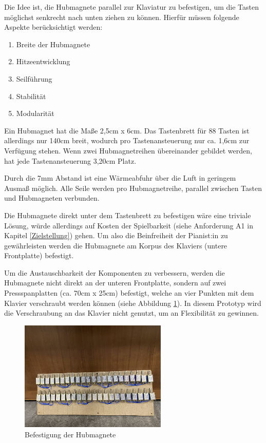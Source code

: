 Die Idee ist, die Hubmagnete parallel zur Klaviatur zu befestigen, um die Tasten möglichst senkrecht nach unten ziehen zu können.
Hierfür müssen folgende Aspekte berücksichtigt werden:

\begin{enumerate}
    \item Breite der Hubmagnete
    \item Hitzeentwicklung
    \item Seilführung
    \item Stabilität
    \item Modularität
\end{enumerate}

Ein Hubmagnet hat die Maße 2,5cm x 6cm.
Das Tastenbrett für 88 Tasten ist allerdings nur 140cm breit, wodurch pro Tastenansteuerung nur ca. 1,6cm zur Verfügung stehen.
Wenn zwei Hubmagnetreihen übereinander gebildet werden, hat jede Tastenansteuerung 3,20cm Platz.

Durch die 7mm Abstand ist eine Wärmeabfuhr über die Luft in geringem Ausmaß möglich.
Alle Seile werden pro Hubmagnetreihe, parallel zwischen Tasten und Hubmagneten verbunden.

Die Hubmagnete direkt unter dem Tastenbrett zu befestigen wäre eine triviale Lösung, würde allerdings auf Kosten der Spielbarkeit (siehe Anforderung A1 in Kapitel \ref{Zielstellung}) gehen.
Um also die Beinfreiheit der Pianist:in zu gewährleisten
werden die Hubmagnete am Korpus des Klaviers (untere Frontplatte) befestigt.

Um die Austauschbarkeit der Komponenten zu verbessern, werden die Hubmagnete nicht direkt an der unteren Frontplatte,
sondern auf zwei Pressspanplatten (ca. 70cm x 25cm) befestigt, welche an vier Punkten mit dem Klavier verschraubt werden können (siehe Abbildung \ref{fig:BefestigungHubmagnete}).
In diesem Prototyp wird die Verschraubung an das Klavier nicht genutzt, um an Flexibilität zu gewinnen.

\begin{figure}[htbp]
    \centering
    \includegraphics[width=7cm]{img/Magnetbrett.jpg}
    \caption{Befestigung der Hubmagnete}
    \label{fig:BefestigungHubmagnete}
\end{figure}


